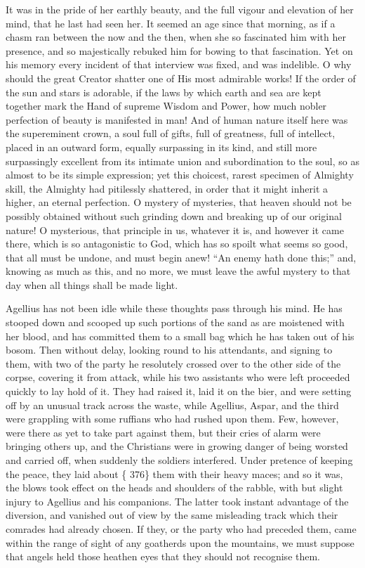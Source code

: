 It was in the pride of her earthly beauty, and the full vigour and
elevation of her mind, that he last had seen her. It seemed an age
since that morning, as if a chasm ran between the now and the then,
when she so fascinated him with her presence, and so majestically
rebuked him for bowing to that fascination. Yet on his memory every
incident of that interview was fixed, and was indelible. O why should
the great Creator shatter one of His most admirable works! If the
order of the sun and stars is adorable, if the laws by which earth and
sea are kept together mark the Hand of supreme Wisdom and Power, how
much nobler perfection of beauty is manifested in man! And of human
nature itself here was the supereminent crown, a soul full of gifts,
full of greatness, full of intellect, placed in an outward form,
equally surpassing in its kind, and still more surpassingly excellent
from its intimate union and subordination to the soul, so as almost to
be its simple expression; yet this choicest, rarest specimen of
Almighty skill, the Almighty had pitilessly shattered, in order that
it might inherit a higher, an eternal perfection. O mystery of
mysteries, that heaven should not be possibly obtained without such
grinding down and breaking up of our original nature! O mysterious,
that principle in us, whatever it is, and however it came there, which
is so antagonistic to God, which has so spoilt what seems so good,
that all must be undone, and must begin anew! ``An enemy hath done
this;'' and, knowing as much as this, and no more, we must leave
the awful mystery to that day when all things shall be made light.

Agellius has not been idle while these thoughts pass through his
mind. He has stooped down and scooped up such portions of the sand as
are moistened with her blood, and has committed them to a small bag
which he has taken out of his bosom. Then without delay, looking round
to his attendants, and signing to them, with two of the party he
resolutely crossed over to the other side of the corpse, covering it
from attack, while his two assistants who were left proceeded quickly
to lay hold of it. They had raised it, laid it on the bier, and were
setting off by an unusual track across the waste, while Agellius,
Aspar, and the third were grappling with some ruffians who had rushed
upon them. Few, however, were there as yet to take part against them,
but their cries of alarm were bringing others up, and the Christians
were in growing danger of being worsted and carried off, when suddenly
the soldiers interfered. Under pretence of keeping the peace, they
laid about \{ 376\} them with their heavy maces; and so it was, the
blows took effect on the heads and shoulders of the rabble, with but
slight injury to Agellius and his companions. The latter took instant
advantage of the diversion, and vanished out of view by the same
misleading track which their comrades had already chosen. If they, or
the party who had preceded them, came within the range of sight of any
goatherds upon the mountains, we must suppose that angels held those
heathen eyes that they should not recognise them.

